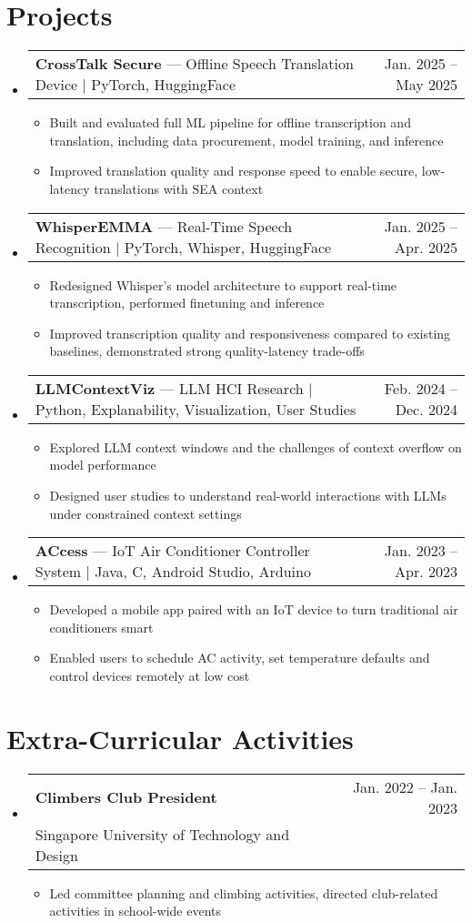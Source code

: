 \documentclass[letterpaper,11pt]{article}
\makeatletter
\newcommand{\resumeItem}[1]{
  \item\small{
    {#1 \vspace{-2pt}}
  }
}
\newcommand{\resumeSubheading}[4]{
  \vspace{-2pt}\item
    \begin{tabular*}{0.97\textwidth}[t]{l@{\extracolsep{\fill}}r}
      \textbf{#1} & #2 \\
      \textnormal{\small#3} & \textnormal{\small #4} \\
    \end{tabular*}\vspace{-7pt}
}
\newcommand{\resumeProjectHeading}[2]{
    \item
    \begin{tabular*}{0.97\textwidth}{l@{\extracolsep{\fill}}r}
      \small#1 & \textnormal{\small #2} \\
    \end{tabular*}\vspace{-7pt}
}
\newcommand{\resumeSubHeadingListStart}{\begin{itemize}[leftmargin=0.15in, label={}]}
\newcommand{\resumeSubHeadingListEnd}{\end{itemize}}
\newcommand{\resumeItemListStart}{\begin{itemize}}
\newcommand{\resumeItemListEnd}{\end{itemize}\vspace{-5pt}}
\makeatother
\begin{document}
\section{Projects}
    \resumeSubHeadingListStart
    
      \resumeProjectHeading
          {\textbf{CrossTalk Secure} --- Offline Speech Translation Device $|$ PyTorch, HuggingFace}{Jan. 2025 -- May 2025}
          \resumeItemListStart
            \resumeItem{Built and evaluated full ML pipeline for offline transcription and translation, including data procurement, model training, and inference}
            \resumeItem{Improved translation quality and response speed to enable secure, low-latency translations with SEA context}
          \resumeItemListEnd

      \resumeProjectHeading
          {\textbf{WhisperEMMA} --- Real-Time Speech Recognition $|$ PyTorch, Whisper, HuggingFace}{Jan. 2025 -- Apr. 2025}
          \resumeItemListStart
            \resumeItem{Redesigned Whisper's model architecture to support real-time transcription, performed finetuning and inference}
            \resumeItem{Improved transcription quality and responsiveness compared to existing baselines, demonstrated strong quality-latency trade-offs}
          \resumeItemListEnd
    
      \resumeProjectHeading
          {\textbf{LLMContextViz} --- LLM HCI Research $|$ Python, Explanability, Visualization, User Studies}{Feb. 2024 -- Dec. 2024}
          \resumeItemListStart
            \resumeItem{Explored LLM context windows and the challenges of context overflow on model performance}
            \resumeItem{Designed user studies to understand real-world interactions with LLMs under constrained context settings}
          \resumeItemListEnd

      \resumeProjectHeading
          {\textbf{ACcess} --- IoT Air Conditioner Controller System $|$ Java, C, Android Studio, Arduino}{Jan. 2023 -- Apr. 2023}
          \resumeItemListStart
            \resumeItem{Developed a mobile app paired with an IoT device to turn traditional air conditioners smart}
            \resumeItem{Enabled users to schedule AC activity, set temperature defaults and control devices remotely at low cost}
          \resumeItemListEnd
    \resumeSubHeadingListEnd

\section{Extra-Curricular Activities}
  \resumeSubHeadingListStart
    \resumeSubheading
      {Climbers Club President }{Jan. 2022  -- Jan. 2023}
      {Singapore University of Technology and Design}{}
      \resumeItemListStart
        \resumeItem{Led committee planning and climbing activities, directed club-related activities in school-wide events}
      \resumeItemListEnd
  \resumeSubHeadingListEnd
%
\end{document}
